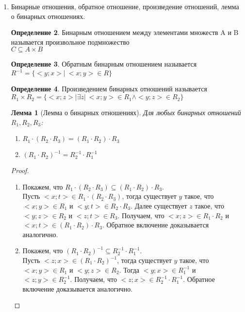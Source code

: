 \documentclass{article}
\newtheorem*{lemma*}{Лемма}
\theoremstyle{definition}
\newtheorem*{definition*}{Определение}
\begin{document}
\begin{enumerate}
\begin{definition*}[Декартова степень]
    \end{definition*}
    \item Бинарные отношения, обратное отношение, произведение отношений, лемма о бинарных отношениях.
        \begin{definition*}Бинарным отношением между элементами множеств A и B называется произвольное подмножество\\
         $C \subseteq{A \times B}$
        \end{definition*}
        \begin{definition*}Обратным бинарным отношением называется \\
        $R^{-1} = \{<y;x> |\ <x;y> \in{R}\}$
        \end{definition*}
        \begin{definition*}Произведением бинарных отношений называется \\
        $R_{1}\times R_{2} = \{<x;z>          |\exists z |\ <x;y> \in R_{1}   \land <y;z> \in R_{2}\}$
        \end{definition*}
    \begin{lemma*}[Лемма о бинарных отношениях]
      Для любых бинарных отношений $R_{1},R_{2},R_{3} $:
      \begin{enumerate}
        \item     $R_{1}\cdot (R_{2}\cdot R_{3}) = (R_{1}\cdot R_{2})\cdot R_{3} $\\
        \item $(R_{1}\cdot R_{2})^{-1} = R_{2}^{-1}\cdot R_{1}^{-1} $
      \end{enumerate}
    \end{lemma*}
    \begin{proof}
      \begin{enumerate}
        \item Покажем, что $R_{1}\cdot (R_{2}\cdot R_{3}) \subseteq (R_{1}\cdot R_{2})\cdot R_{3} $. \\
        Пусть $<x;t> \in R_{1}\cdot (R_{2}\cdot R_{3})$, тогда существует $y$ такое, что \\ $<x;y>\in R_{1}$ и $<y;t>\in R_{2}\cdot R_{3}$. Далее существует $z$ такое, что  $<y;z>\in R_{2}$ и  $<z;t>\in R_{3}$. Получаем, что $<x;z>\in R_{1}\cdot R_{2}$ и $<x;t>\in (R_{1}\cdot R_{2})\cdot R_{3}$.
        Обратное включение доказывается аналогично.
        \item Покажем, что $(R_{1}\cdot R_{2})^{-1} \subseteq R_{2}^{-1}\cdot R_{1}^{-1} $.\\
        Пусть $<z;x> \in (R_{1}\cdot R_{2})^{-1}$, тогда существует $y$ такое, что $<x;y>\in R_{1}$ и $<y;z>\in R_{2}$. Тогда $<y;x>\in R_{1}^{-1}$ и
        $<z;y>\in R_{2}^{-1}$.
        Получаем, что $<z;x> \in R_{2}^{-1}\cdot R_{1}^{-1} $.
        Обратное включение доказывается аналогично.
      \end{enumerate}
    \end{proof}

  \end{enumerate}
\end{document}
